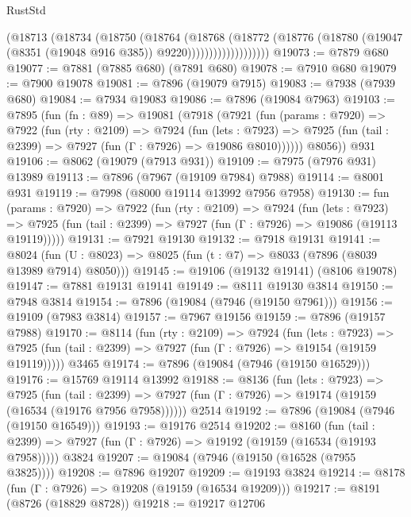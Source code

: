 \begin{lexlean}{RustStd}
\begin{coremodule}
                        (@18713
                          (@18734
                            (@18750
                              (@18764
                                (@18768
                                  (@18772
                                    (@18776
                                      (@18780
                                        (@19047 (@8351 (@19048 @916 @385)) @9220)))))))))))))))))))
@19073 := @7879 @680
@19077 := @7881 (@7885 @680) (@7891 @680)
@19078 := @7910 @680
@19079 := @7900 @19078
@19081 := @7896 (@19079 @7915)
@19083 := @7938 (@7939 @680)
@19084 := @7934 @19083
@19086 := @7896 (@19084 @7963)
@19103 := @7895
    (fun (fn : @89) =>
    @19081
      (@7918
        (@7921
          (fun (params : @7920) =>
          @7922
            (fun (rty : @2109) =>
            @7924
              (fun (lets : @7923) =>
              @7925 (fun (tail : @2399) => @7927 (fun (Γ : @7926) => @19086 @8010))))))
        @8056))
    @931
@19106 := @8062 (@19079 (@7913 @931))
@19109 := @7975 (@7976 @931) @13989
@19113 := @7896 (@7967 (@19109 @7984) @7988)
@19114 := @8001 @931
@19119 := @7998 (@8000 @19114 @13992 @7956 @7958)
@19130 := fun (params : @7920) =>
  @7922
    (fun (rty : @2109) =>
    @7924
      (fun (lets : @7923) =>
      @7925 (fun (tail : @2399) => @7927 (fun (Γ : @7926) => @19086 (@19113 @19119)))))
@19131 := @7921 @19130
@19132 := @7918 @19131
@19141 := @8024
    (fun (U : @8023) => @8025 (fun (t : @7) => @8033 (@7896 (@8039 @13989 @7914) @8050)))
@19145 := @19106 (@19132 @19141) (@8106 @19078)
@19147 := @7881 @19131 @19141
@19149 := @8111 @19130 @3814
@19150 := @7948 @3814
@19154 := @7896 (@19084 (@7946 (@19150 @7961)))
@19156 := @19109 (@7983 @3814)
@19157 := @7967 @19156
@19159 := @7896 (@19157 @7988)
@19170 := @8114
    (fun (rty : @2109) =>
    @7924
      (fun (lets : @7923) =>
      @7925 (fun (tail : @2399) => @7927 (fun (Γ : @7926) => @19154 (@19159 @19119)))))
    @3465
@19174 := @7896 (@19084 (@7946 (@19150 @16529)))
@19176 := @15769 @19114 @13992
@19188 := @8136
    (fun (lets : @7923) =>
    @7925
      (fun (tail : @2399) =>
      @7927 (fun (Γ : @7926) => @19174 (@19159 (@16534 (@19176 @7956 @7958))))))
    @2514
@19192 := @7896 (@19084 (@7946 (@19150 @16549)))
@19193 := @19176 @2514
@19202 := @8160
    (fun (tail : @2399) => @7927 (fun (Γ : @7926) => @19192 (@19159 (@16534 (@19193 @7958)))))
    @3824
@19207 := @19084 (@7946 (@19150 (@16528 (@7955 @3825))))
@19208 := @7896 @19207
@19209 := @19193 @3824
@19214 := @8178 (fun (Γ : @7926) => @19208 (@19159 (@16534 @19209)))
@19217 := @8191 (@8726 (@18829 @8728))
@19218 := @19217 @12706

\end{coremodule}
\end{lexlean}
